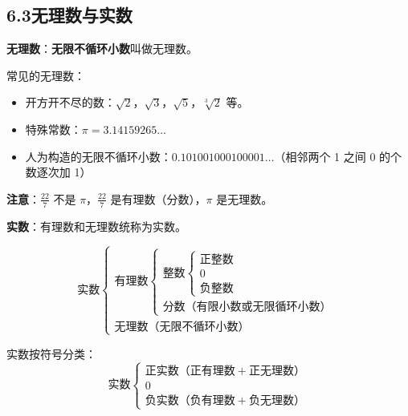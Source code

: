 \documentclass[12pt, a4paper]{ctexart}
\begin{document}
\subsection*{6.3\quad 无理数与实数}

\begin{knowledgebox}
\textbf{无理数}：\textbf{无限不循环小数}叫做无理数。

常见的无理数：
\begin{itemize}[leftmargin=2em]
  \item 开方开不尽的数：$\sqrt{2}$，$\sqrt{3}$，$\sqrt{5}$，$\sqrt[3]{2}$ 等。
  \item 特殊常数：$\pi = 3.14159265\ldots$
  \item 人为构造的无限不循环小数：$0.101001000100001\ldots$（相邻两个 1 之间 0 的个数逐次加 1）
\end{itemize}

\textbf{注意}：$\frac{22}{7}$ 不是 $\pi$，$\frac{22}{7}$ 是有理数（分数），$\pi$ 是无理数。
\end{knowledgebox}

\begin{knowledgebox}
\textbf{实数}：有理数和无理数统称为实数。

\[
\text{实数}
\begin{cases}
\text{有理数}
\begin{cases}
\text{整数}
\begin{cases}
\text{正整数} \\[2pt]
0 \\[2pt]
\text{负整数}
\end{cases} \\[6pt]
\text{分数（有限小数或无限循环小数）}
\end{cases} \\[10pt]
\text{无理数}（\text{无限不循环小数}）
\end{cases}
\]

实数按符号分类：
\[
\text{实数}
\begin{cases}
\text{正实数}（正有理数 + 正无理数） \\[2pt]
0 \\[2pt]
\text{负实数}（负有理数 + 负无理数）
\end{cases}
\]
\end{knowledgebox}
\end{document}
